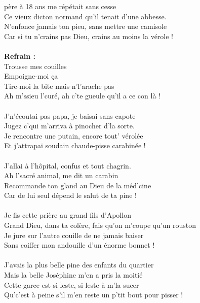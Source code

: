 
 père à 18 ans me répétait sans cesse
\\Ce vieux dicton normand qu'il tenait d'une abbesse.
\\N'enfonce jamais ton pieu, sans mettre une camisole
\\Car si tu n'crains pas Dieu, crains au moins la vérole !
\\\\\textbf{Refrain :}
\\Trousse mes couilles
\\Empoigne-moi ça
\\Tire-moi la bite mais n'l'arache pas
\\Ah m'ssieu l'curé, ah c'te gueule qu'il a ce con là !
\\\\J'n'écoutai pas papa, je baisai sans capote
\\Jugez c'qui m'arriva à pinocher d'la sorte.
\\Je rencontre une putain, encore tout' vérolée
\\Et j'attrapai soudain chaude-pisse carabinée !
\\\\J'allai à l'hôpital, confus et tout chagrin.
\\Ah l'sacré animal, me dit un carabin
\\Recommande ton gland au Dieu de la méd'cine
\\Car de lui seul dépend le salut de ta pine !
\\\\Je fis cette prière au grand fils d'Apollon
\\Grand Dieu, dans ta colère, fais qu'on m'coupe qu'un rouston
\\Je jure sur l'autre couille de ne jamais baiser
\\Sans coiffer mon andouille d'un énorme bonnet !
\\\\J'avais la plus belle pine des enfants du quartier
\\Mais la belle Joséphine m'en a pris la moitié
\\Cette garce est si leste, si leste à m'la sucer
\\Qu'c'est à peine s'il m'en reste un p'tit bout pour pisser !

\breakpage
